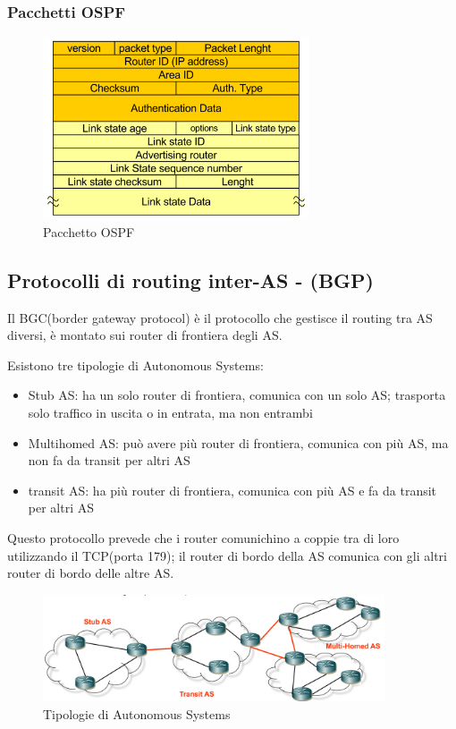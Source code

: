 \subsubsection{Pacchetti OSPF}

\begin{figure}[h!]
    \centering
    \includegraphics[width=0.7\textwidth]{images/pacchettoospf.png}
    \caption{Pacchetto OSPF}
    \label{fig:pacchettoospf}
\end{figure}

\subsection{Protocolli di routing inter-AS - (BGP)}
Il BGC(border gateway protocol) è il protocollo che gestisce il routing tra AS diversi, è montato sui router di frontiera degli AS.

Esistono tre tipologie di Autonomous Systems:  
\begin{itemize}
    \item Stub AS: ha un solo router di frontiera, comunica con un solo AS; trasporta solo traffico in uscita o in entrata, ma non entrambi
    \item Multihomed AS: può avere più router di frontiera, comunica con più AS, ma non fa da transit per altri AS
    \item transit AS: ha più router di frontiera, comunica con più AS e fa da transit per altri AS
\end{itemize}
Questo protocollo prevede che i router comunichino a coppie tra di loro utilizzando il TCP(porta 179); il router di bordo della AS comunica con gli altri router di bordo delle altre AS.

\begin{figure}[h!]
    \centering
    \includegraphics[width=0.9\textwidth]{images/tipologieAS.png}
    \caption{Tipologie di Autonomous Systems}
    \label{fig:tipologieAS}
\end{figure}

